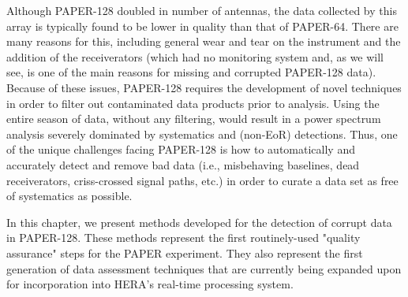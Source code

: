 Although PAPER-128 doubled in number of antennas, the data collected by this array is typically found to be lower in quality than that of PAPER-64. There are many reasons for this, including general wear and tear on the instrument and the addition of the receiverators (which had no monitoring system and, as we will see, is one of the main reasons for missing and corrupted PAPER-128 data). Because of these issues, PAPER-128 requires the development of novel techniques in order to filter out contaminated data products prior to analysis. Using the entire season of data, without any filtering, would result in a power spectrum analysis severely dominated by systematics and (non-EoR) detections. Thus, one of the unique challenges facing PAPER-128 is how to automatically and accurately detect and remove bad data (i.e., misbehaving baselines, dead receiverators, criss-crossed signal paths, etc.) in order to curate a data set as free of systematics as possible.

In this chapter, we present methods developed for the detection of corrupt data in PAPER-128. These methods represent the first routinely-used "quality assurance" steps for the PAPER experiment. They also represent the first generation of data assessment techniques that are currently being expanded upon for incorporation into HERA's real-time processing system. 

